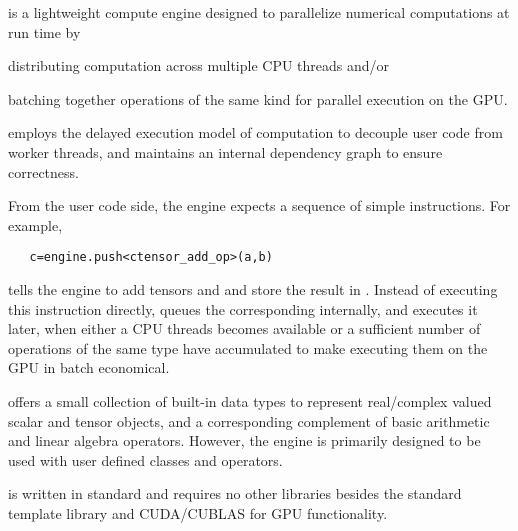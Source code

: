 \Cengine{} is a lightweight compute engine designed to %
parallelize numerical computations at run time by 
\begin{compactenum}[~~(a)]
\item distributing computation across multiple CPU threads and/or  
\item batching together operations of the same kind for parallel execution on the GPU. 
\end{compactenum}
\Cengine{} employs the delayed execution model of computation to decouple user code %
from worker threads, 
and maintains an internal dependency graph %
to ensure correctness. %

From the user code side, the engine expects a sequence of simple instructions. For example, 

\texttt{~~~c=engine.push<ctensor\_add\_op>(a,b)}

tells the engine to add tensors  and  and store the result in . 
Instead of executing this instruction directly, 
\Cengine{} queues the corresponding  internally, %
and executes it later, when either a CPU threads becomes 
available or a sufficient number of operations of the same type have accumulated to 
make executing them on the GPU in batch economical. 

\Cengine{} offers a small collection of built-in data types %
to represent real/complex valued scalar and tensor objects, and a corresponding complement of 
basic arithmetic and linear algebra operators. 
However, the engine is primarily designed to be used with user defined classes and operators. 

\Cengine{} is written in standard \cppe{} and requires no other libraries besides the standard 
template library and CUDA/CUBLAS for GPU functionality.  

